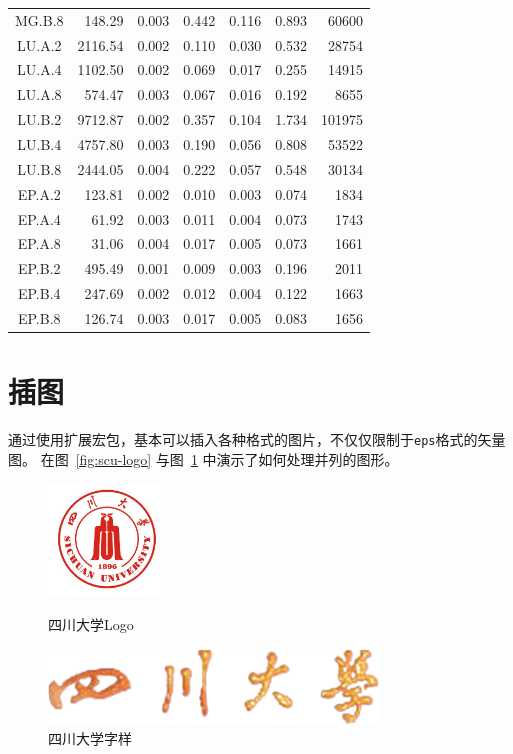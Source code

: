 \begin{longtable}[c]{c*{6}{r}}
MG.B.8 & 148.29 & 0.003 & 0.442 & 0.116 & 0.893 & 60600 \\
LU.A.2 & 2116.54 & 0.002 & 0.110 & 0.030 & 0.532 & 28754 \\
LU.A.4 & 1102.50 & 0.002 & 0.069 & 0.017 & 0.255 & 14915 \\
LU.A.8 & 574.47 & 0.003 & 0.067 & 0.016 & 0.192 & 8655 \\
LU.B.2 & 9712.87 & 0.002 & 0.357 & 0.104 & 1.734 & 101975 \\
LU.B.4 & 4757.80 & 0.003 & 0.190 & 0.056 & 0.808 & 53522 \\
LU.B.8 & 2444.05 & 0.004 & 0.222 & 0.057 & 0.548 & 30134 \\
EP.A.2 & 123.81 & 0.002 & 0.010 & 0.003 & 0.074 & 1834 \\
EP.A.4 & 61.92 & 0.003 & 0.011 & 0.004 & 0.073 & 1743 \\
EP.A.8 & 31.06 & 0.004 & 0.017 & 0.005 & 0.073 & 1661 \\
EP.B.2 & 495.49 & 0.001 & 0.009 & 0.003 & 0.196 & 2011 \\
EP.B.4 & 247.69 & 0.002 & 0.012 & 0.004 & 0.122 & 1663 \\
EP.B.8 & 126.74 & 0.003 & 0.017 & 0.005 & 0.083 & 1656 \\
\bottomrule[1.5pt]
\end{longtable}

\section{插图}
通过使用扩展宏包，基本可以插入各种格式的图片，不仅仅限制于\texttt{eps}格式的矢量图。 在图~\ref{fig:scu-logo} 与图~\ref{fig:scu-hanji} 中演示了如何处理并列的图形。

\begin{figure}[htb]
	\centering
	\begin{minipage}{.35\textwidth}
	  \centering
	  \includegraphics[height=3cm]{images/logo}
	  \caption{四川大学Logo} \label{fig:scu-logo}
	\end{minipage}
	\begin{minipage}{.55\textwidth}
	  \centering
		\vskip1cm
	  \includegraphics[height=2cm]{images/scu}
	  \caption{四川大学字样} \label{fig:scu-hanji}
	\end{minipage}
\end{figure}

